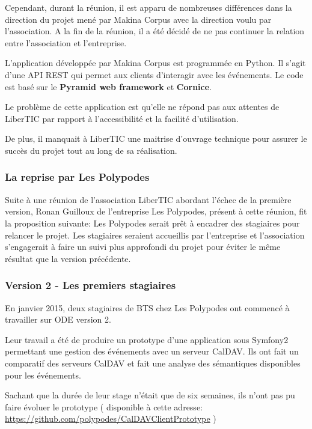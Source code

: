 Cependant, durant la réunion, il est apparu de nombreuses différences dans la direction du projet mené par Makina Corpus avec la direction voulu par l'association. A la fin de la réunion, il a été décidé de ne pas continuer la relation entre l'association et l'entreprise.

L'application développée par Makina Corpus est programmée en Python. Il s'agit d'une API REST qui permet aux clients d'interagir avec les événements. Le code est basé sur le \textbf{Pyramid web framework} et \textbf{Cornice}.

Le problème de cette application est qu'elle ne répond pas aux attentes de LiberTIC par rapport à l'accessibilité et la facilité d'utilisation.

De plus, il manquait à LiberTIC une maitrise d'ouvrage technique pour assurer le succès du projet tout au long de sa réalisation.

\subsubsection*{La reprise par Les Polypodes}

Suite à une réunion de l'association LiberTIC abordant l'échec de la première version, Ronan Guilloux de l'entreprise Les Polypodes, présent à cette réunion, fit la proposition suivante: Les Polypodes serait prêt à encadrer des stagiaires pour relancer le projet. Les stagiaires seraient accueillis par l'entreprise et l'association s'engagerait à faire un suivi plus approfondi du projet pour éviter le même résultat que la version précédente.

\subsubsection*{Version 2 - Les premiers stagiaires}

En janvier 2015, deux stagiaires de BTS chez Les Polypodes ont commencé à travailler sur ODE version 2.

Leur travail a été de produire un prototype d'une application sous Symfony2 permettant une gestion des événements avec un serveur CalDAV. Ils ont fait un comparatif des serveurs CalDAV et fait une analyse des sémantiques disponibles pour les événements.

Sachant que la durée de leur stage n'était que de six semaines, ils n'ont pas pu faire évoluer le prototype ( disponible à cette adresse: \url{https://github.com/polypodes/CalDAVClientPrototype} )

